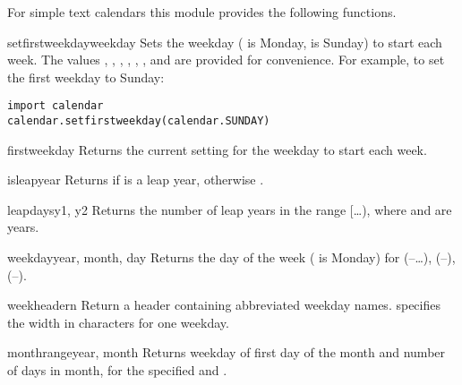 For simple text calendars this module provides the following functions.

\begin{funcdesc}{setfirstweekday}{weekday}
Sets the weekday ( is Monday,  is Sunday) to start
each week. The values , ,
, , ,
, and  are provided for
convenience. For example, to set the first weekday to Sunday:

\begin{verbatim}
import calendar
calendar.setfirstweekday(calendar.SUNDAY)
\end{verbatim}
\end{funcdesc}

\begin{funcdesc}{firstweekday}{}
Returns the current setting for the weekday to start each week.
\end{funcdesc}

\begin{funcdesc}{isleap}{year}
Returns  if  is a leap year, otherwise
.
\end{funcdesc}

\begin{funcdesc}{leapdays}{y1, y2}
Returns the number of leap years in the range
[\ldots{}), where  and  are years.
\end{funcdesc}

\begin{funcdesc}{weekday}{year, month, day}
Returns the day of the week ( is Monday) for 
(--\ldots),  (--), 
(--).
\end{funcdesc}

\begin{funcdesc}{weekheader}{n}
Return a header containing abbreviated weekday names.  specifies
the width in characters for one weekday.
\end{funcdesc}

\begin{funcdesc}{monthrange}{year, month}
Returns weekday of first day of the month and number of days in month, 
for the specified  and .
\end{funcdesc}

